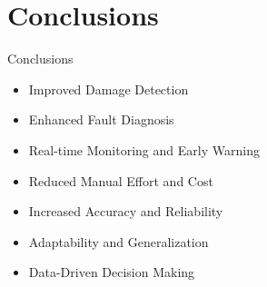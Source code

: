 \documentclass[10pt,aspectratio=169,dvipsnames]{beamer} %
\begin{document}
\section{Conclusions}
\begin{frame}{Conclusions}		
		\begin{justify}
			\addtolength{\leftmargini}{\labelsep}
			\begin{itemize}
				\item{Improved Damage Detection}			
				\item{Enhanced Fault Diagnosis}	
				\item{Real-time Monitoring and Early Warning}					
				\item{Reduced Manual Effort and Cost}
				\item{Increased Accuracy and Reliability}
				\item{Adaptability and Generalization}
				\item{Data-Driven Decision Making}
			\end{itemize}
		\end{justify}									
\end{frame}			
\end{document}
